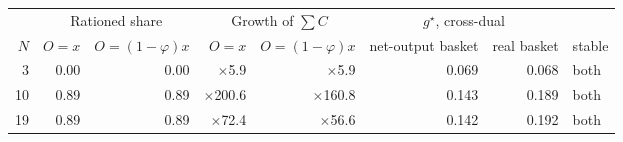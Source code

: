 \begin{tabular}{rrrrrrrl}
\toprule
 & \multicolumn{2}{c}{Rationed share} & \multicolumn{2}{c}{Growth of \(\sum C\)} & \multicolumn{2}{c}{\(g^\star\), cross-dual} & \\
\(N\) & \(O=x\) & \(O=(1-\varphi)x\) & \(O=x\) & \(O=(1-\varphi)x\) & net-output basket & real basket & stable \\
\midrule
3 & 0.00 & 0.00 & \(\times\)5.9 & \(\times\)5.9 & 0.069 & 0.068 & both \\
10 & 0.89 & 0.89 & \(\times\)200.6 & \(\times\)160.8 & 0.143 & 0.189 & both \\
19 & 0.89 & 0.89 & \(\times\)72.4 & \(\times\)56.6 & 0.142 & 0.192 & both \\
\bottomrule
\end{tabular}
